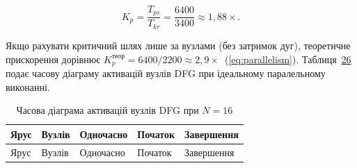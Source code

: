 \[K_{p} = \frac{T_{ps}}{T_{kr}} = \frac{6400}{3400} \approx 1,88 \times .\]

Якщо рахувати критичний шлях лише за вузлами (без затримок дуг),
теоретичне прискорення дорівнює
\(K_{p}^{\text{теор}} = 6400/2200 \approx 2,9 \times\)~(\hyperref[eq:parallelism]{{[}eq:parallelism{]}}).
Таблиця~\hyperref[tab:timeline]{26} подає часову діаграму активацій
вузлів DFG при ідеальному паралельному виконанні.

\begin{longtable}[]{@{}
  >{\raggedright\arraybackslash}p{}
  >{\raggedright\arraybackslash}p{}
  >{\raggedright\arraybackslash}p{}
  >{\raggedright\arraybackslash}p{}
  >{\raggedright\arraybackslash}p{}@{}}
\caption{\protect{}\label{tab:timeline}{}Часова діаграма
активацій вузлів DFG при \(N = 16\)}\tabularnewline
\toprule\noalign{}
\begin{minipage}[b]{\linewidth}\raggedright
Ярус
\end{minipage} & \begin{minipage}[b]{\linewidth}\raggedright
Вузлів
\end{minipage} & \begin{minipage}[b]{\linewidth}\raggedright
Одночасно
\end{minipage} & \begin{minipage}[b]{\linewidth}\raggedright
Початок
\end{minipage} & \begin{minipage}[b]{\linewidth}\raggedright
Завершення
\end{minipage} \\
\midrule\noalign{}
\endfirsthead
\toprule\noalign{}
\begin{minipage}[b]{\linewidth}\raggedright
Ярус
\end{minipage} & \begin{minipage}[b]{\linewidth}\raggedright
Вузлів
\end{minipage} & \begin{minipage}[b]{\linewidth}\raggedright
Одночасно
\end{minipage} & \begin{minipage}[b]{\linewidth}\raggedright
Початок
\end{minipage} & \begin{minipage}[b]{\linewidth}\raggedright
Завершення

\end{minipage}
\end{longtable}

